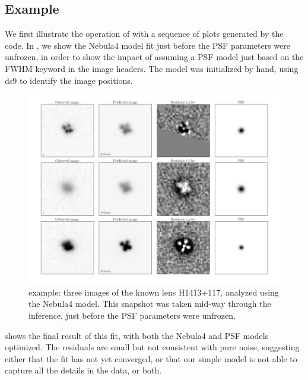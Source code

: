 \documentclass[useAMS,usenatbib]{mn2e}
\begin{document}
\subsection{Example}
\label{sec:results:example}

We first illustrate the operation of \LT with a sequence of plots generated
by the code. In , we show the Nebula4 model
fit just before the PSF parameters were unfrozen, in order to show the
impact of assuming a PSF model just based on the FWHM keyword in the image
headers. The model was initialized by hand, using ds9 to identify the image
positions.

\begin{figure}
\centerline{
\includegraphics[width=0.9\linewidth]{figs/H1413+117_10x10arcsec_progress-06_optimizing_Nebula4.png}}
\caption{\LT example: three images of the known lens H1413+117, analyzed using
the Nebula4 model. This snapshot was taken mid-way through the inference, just
before the PSF parameters were unfrozen.}
\label{fig:H1413example-progress}
\end{figure}

 shows the final result of this fit, with both
the Nebula4 and PSF models optimized. The residuals are small but not
consistent with pure noise, suggesting either that the fit has not yet
converged, or that our simple model is not able to capture all the details
in the data, or both.

\end{document}
